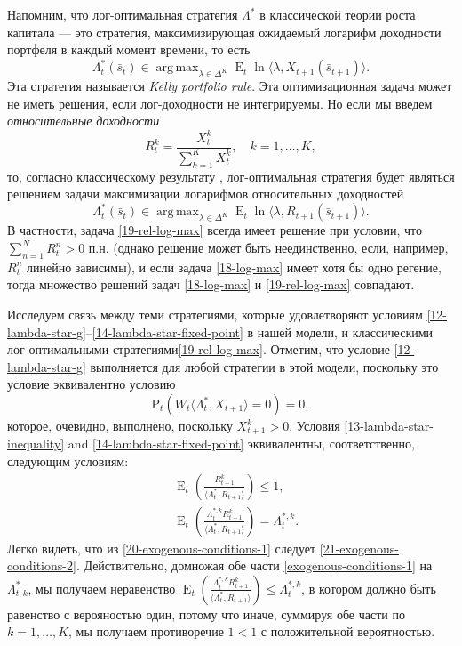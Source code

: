 \documentclass[a4paper,12pt,russian]{article} %
\theoremstyle{definition}
\DeclareMathOperator{\E}{E}
\DeclareMathOperator{\argmax}{arg\,max}
\renewcommand{\P}{\mathrm{P}}
\begin{document}
Напомним, что лог-оптимальная стратегия $\Lambda^*$ в классической теории роста капитала — это стратегия, максимизирующая ожидаемый логарифм доходности портфеля в каждый момент времени, то есть 
\begin{equation}
\label{18-log-max}
\Lambda_t^*(\bar s_t) 
\in \argmax_{\lambda\in \Delta^K} 
  \E_t \ln\langle \lambda, X_{t+1}(\bar s_{t+1})\rangle.
\end{equation}
Эта стратегия называется \emph{Kelly portfolio rule}.
Эта оптимизационная задача может не иметь решения, если лог-доходности не интегрируемы. Но если мы введем  \emph{относительные доходности}
\[
R_{t}^k = \frac{X_{t}^k}{\sum_{k=1}^K X_{t}^k}, \quad k=1,\dots,K,
\]
то, согласно классическому результату \cite{AlgoetCover1988}, лог-оптимальная стратегия будет являться решением задачи максимизации логарифмов относительных доходностей
\begin{equation}
\label{19-rel-log-max}
\Lambda^*_t(\bar s_t) 
\in \argmax_{\lambda\in \Delta^K} 
  \E_t \ln\langle \lambda, R_{t+1}(\bar s_{t+1})\rangle.
\end{equation}
В частности, задача \eqref{19-rel-log-max} всегда имеет решение при условии, что 
$\sum_{n=1}^N R_t^n > 0$ п.н. (однако решение может быть неединственно, если, например, $R_t^n$ линейно зависимы), и если задача  \eqref{18-log-max} имеет хотя бы одно регение, тогда множество решений задач \eqref{18-log-max} и \eqref{19-rel-log-max} совпадают. 

Исследуем связь между теми стратегиями, которые удовлетворяют условиям \eqref{12-lambda-star-g}--\eqref{14-lambda-star-fixed-point} в нашей модели, и классическими лог-оптимальными стратегиями\eqref{19-rel-log-max}. 
Отметим, что условие \eqref{12-lambda-star-g} выполняется для любой стратегии в этой модели, поскольку это условие эквивалентно условию
\[
\P_t(W_t \langle \Lambda_t^*, X_{t+1}\rangle = 0) = 0,
\]
которое, очевидно, выполнено, поскольку $X_{t+1}^k>0$. 
Условия \eqref{13-lambda-star-inequality} and \eqref{14-lambda-star-fixed-point} эквивалентны, соответственно, следующим условиям:
\begin{align}
\label{20-exogenous-conditions-1}
&\E_t\left(\frac{R_{t+1}^k}{\langle \Lambda_t^*, R_{t+1}\rangle}\right) \le 1, \\
\label{21-exogenous-conditions-2}
&\E_t\left(
  \frac{\Lambda_{t}^{*,k} R_{t+1}^k}{\langle \Lambda_t^*, R_{t+1}\rangle}
\right)
= \Lambda_{t}^{*,k}.
\end{align}
Легко видеть, что из \eqref{20-exogenous-conditions-1} следует \eqref{21-exogenous-conditions-2}.
Действительно, домножая обе части \eqref{exogenous-conditions-1} на $\Lambda_{t,k}^*$, мы получаем неравенство $\E_t\left(
  \frac{\Lambda_{t}^{*,k} R_{t+1}^k}{\langle \Lambda_t^*, R_{t+1}\rangle}
\right)
\le \Lambda_{t}^{*,k}$, в котором должно быть равенство с верояностью один, потому что иначе, суммируя обе части по $k=1,\dots,K$, мы получаем противоречие $1<1$ с положительной вероятностью.
\end{document}
